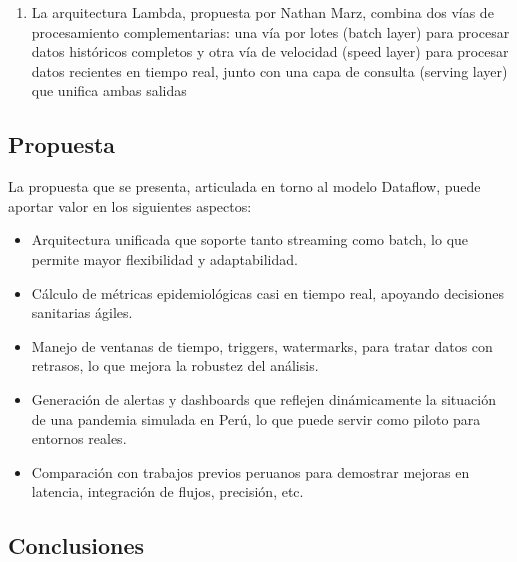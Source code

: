 \documentclass[12pt,a4paper]{article}
\providecommand{\tightlist}{%
  \setlength{\itemsep}{0pt}\setlength{\parskip}{0pt}}
\begin{document}
\begin{enumerate}
          \emph{Transformación digital: Perú valida interoperabilidad de historias clínicas electrónicas} --- \textcite{ops2025interoperabilidad}.\\ Se trata de una iniciativa reciente que busca interoperabilidad en los registros clínicos electrónicos. Esto aporta al contexto tecnológico, interoperabilidad y digitalización de datos en salud en Perú, lo cual será relevante para integraciones de datos en tu pipeline.
    \item
          La arquitectura Lambda, propuesta por Nathan Marz, combina dos vías de procesamiento complementarias: una vía por lotes (batch layer) para procesar datos históricos completos y otra vía de velocidad (speed layer) para procesar datos recientes en tiempo real, junto con una capa de consulta (serving layer) que unifica ambas salidas
\end{enumerate}

\subsection{Propuesta}\label{propuesta}

La propuesta que se presenta, articulada en torno al modelo Dataflow, puede aportar valor en los siguientes aspectos:

\begin{itemize}
    \tightlist
    \item
          Arquitectura unificada que soporte tanto streaming como batch, lo que permite mayor flexibilidad y adaptabilidad.
    \item
          Cálculo de métricas epidemiológicas casi en tiempo real, apoyando decisiones sanitarias ágiles.
    \item
          Manejo de ventanas de tiempo, triggers, watermarks, para tratar datos con retrasos, lo que mejora la robustez del análisis.
    \item
          Generación de alertas y dashboards que reflejen dinámicamente la situación de una pandemia simulada en Perú, lo que puede servir como piloto para entornos reales.
    \item
          Comparación con trabajos previos peruanos para demostrar mejoras en latencia, integración de flujos, precisión, etc.
\end{itemize}

\subsection{Conclusiones}\label{conclusiones-estado-arte}
\end{document}

